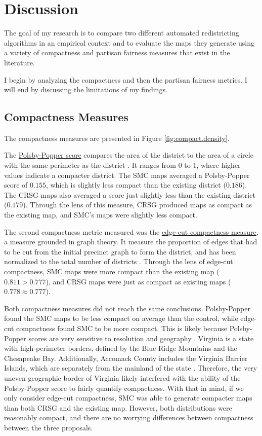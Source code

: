 \section{Discussion}
\label{sec:disc}

The goal of my research is to compare two different automated redistricting algorithms in an empirical context and to evaluate the maps they generate using a variety of compactness and partisan fairness measures that exist in the literature. 

I begin by analyzing the compactness and then the partisan fairness metrics. I will end by discussing the limitations of my findings. 

\subsection{Compactness Measures}

The compactness measures are presented in Figure \ref{fig:compact.density}. 

The \hyperref[sec:polsbypopper]{Polsby-Popper score} compares the area of the district to the area of a circle with the same perimeter as the district \parencite{polsby1991}. It ranges from 0 to 1, where higher values indicate a compacter district. The SMC maps averaged a Polsby-Popper score of $0.155$, which is slightly less compact than the existing district ($0.186$). The CRSG maps also averaged a score just slightly less than the existing district ($0.179$). Through the lens of this measure, CRSG produced maps as compact as the existing map, and SMC's maps were slightly less compact. 

The second compactness metric measured was the \hyperref[sec:edgecut]{edge-cut compactness measure}, a measure grounded in graph theory. It measure the proportion of edges that had to be cut from the initial precinct graph to form the district, and has been normalized to the total number of districts \parencite{dube2016}. Through the lens of edge-cut compactness, SMC maps were more compact than the existing map ($0.811 > 0.777$), and CRSG maps were just as compact as existing maps ($0.778 \approx 0.777$). 

Both compactness measures did not reach the same conclusions. Polsby-Popper found the SMC maps to be less compact on average than the control, while edge-cut compactness found SMC to be more compact. This is likely because Polsby-Popper scores are very sensitive to resolution and geography \parencite{mccartan2020}. Virginia is a state with high-perimeter borders, defined by the Blue Ridge Mountains and the Chesapeake Bay. Additionally, Accomack County includes the Virginia Barrier Islands, which are separately from the mainland of the state \parencite{unitedstatesgeologicalsurvey2021}. Therefore, the very uneven geographic border of Virginia likely interfered with the ability of the Polsby-Popper score to fairly quantify compactness. With that in mind, if we only consider edge-cut compactness, SMC was able to generate compacter maps than both CRSG and the existing map. However, both distributions were reasonably compact, and there are no worrying differences between compactness between the three proposals. 

